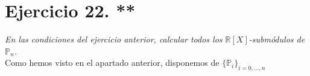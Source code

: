 \section{Ejercicio 22. **} \textit{En las condiciones del ejercicio anterior, calcular
  todos los \(\mathbb{R}[X]\)-submódulos de \(\mathbb{P}_n\).}\\

Como hemos visto en el apartado anterior, disponemos de \(\{\mathbb{P}_i\}_{i=0,\dots,n}\)
